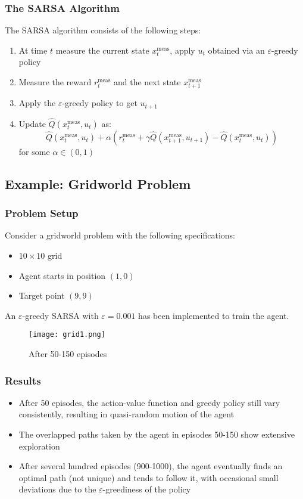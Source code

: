 \documentclass[openany]{book}
\theoremstyle{definition}
\theoremstyle{remark}
\begin{document}
\subsubsection{The SARSA Algorithm}
The SARSA algorithm consists of the following steps:
\begin{enumerate}
    \item At time $t$ measure the current state $x_t^{\text{meas}}$, apply $u_t$ obtained via an $\varepsilon$-greedy policy
    \item Measure the reward $r_t^{\text{meas}}$ and the next state $x_{t+1}^{\text{meas}}$
    \item Apply the $\varepsilon$-greedy policy to get $u_{t+1}$
    \item Update $\hat{Q}(x_t^{\text{meas}}, u_t)$ as:
    \[
        \hat{Q}(x_t^{\text{meas}}, u_t) + \alpha(r_t^{\text{meas}} + \gamma\hat{Q}(x_{t+1}^{\text{meas}}, u_{t+1}) - \hat{Q}(x_t^{\text{meas}}, u_t))
    \]
    for some $\alpha \in (0,1)$
\end{enumerate}

\subsection{Example: Gridworld Problem}
\subsubsection{Problem Setup}
Consider a gridworld problem with the following specifications:
\begin{itemize}
    \item $10 \times 10$ grid
    \item Agent starts in position $(1,0)$
    \item Target point $(9,9)$
\end{itemize}

An $\varepsilon$-greedy SARSA with $\varepsilon = 0.001$ has been implemented to train the agent.

\begin{figure}[ht]
    \centering
    \texttt{[image: grid1.png]}
    \caption{After 50-150 episodes}
    \label{fig:grid1}
\end{figure}

\subsubsection{Results}
\begin{itemize}
    \item After 50 episodes, the action-value function and greedy policy still vary consistently, resulting in quasi-random motion of the agent
    \item The overlapped paths taken by the agent in episodes 50-150 show extensive exploration
    \item After several hundred episodes (900-1000), the agent eventually finds an optimal path (not unique) and tends to follow it, with occasional small deviations due to the $\varepsilon$-greediness of the policy
\end{itemize}
\end{document}
